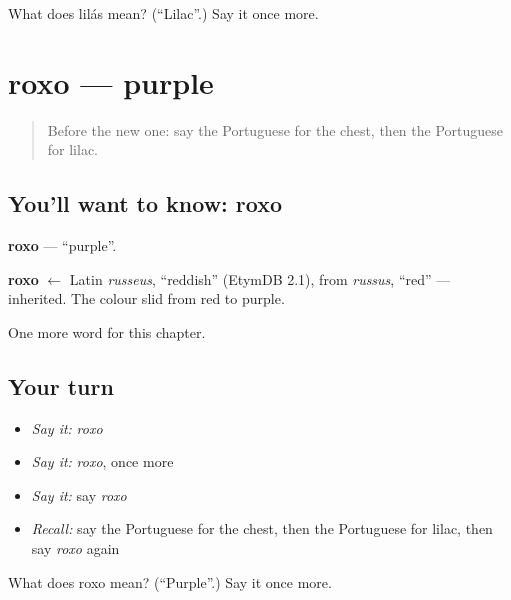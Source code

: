 \begin{tcolorbox}[breakable,colback=teal!4,colframe=teal!35!black,title={Before you move on}]
What does lilás mean? (\textquotedblleft{}Lilac\textquotedblright{}.) Say it once more.
\end{tcolorbox}
\section[roxo]{roxo — purple}

\label{lesson:PT-C121-roxo}



\begin{quote}
Before the new one: say the Portuguese for the chest, then the Portuguese for lilac.
\end{quote}

\subsection*{You'll want to know: roxo}
\textbf{roxo} — \textquotedblleft{}purple\textquotedblright{}.

\begin{cousinweb}
\textbf{roxo} $\leftarrow$ Latin \emph{russeus}, \textquotedblleft{}reddish\textquotedblright{} (EtymDB 2.1), from \emph{russus}, \textquotedblleft{}red\textquotedblright{} — inherited. The colour slid from red to purple.
\end{cousinweb}

\begin{grammarlens}[title={What you've built}]
One more word for this chapter.
\end{grammarlens}

\subsection*{Your turn}
\begin{itemize}
\raggedright
  \item \emph{Say it:} \emph{roxo}
  \item \emph{Say it:} \emph{roxo}, once more
  \item \emph{Say it:} say \emph{roxo}
  \item \emph{Recall:} say the Portuguese for the chest, then the Portuguese for lilac, then say \emph{roxo} again
\end{itemize}

\begin{tcolorbox}[breakable,colback=teal!4,colframe=teal!35!black,title={Before you move on}]
What does roxo mean? (\textquotedblleft{}Purple\textquotedblright{}.) Say it once more.
\end{tcolorbox}
